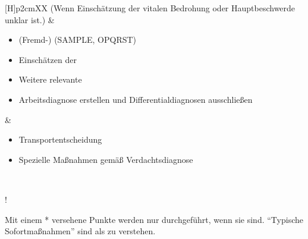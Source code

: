 \documentclass[
ngerman,
paper=a4,
asymmetric,
fontsize=10pt,
headings=small,
draft=false,
numbers=noenddot,
bibtotocnumbered,
footnotes=multiple,
]{scrreprt}
\begin{document}
{\begin{minipage}[t]{\linewidth -
{2\fboxrule} - {2\fboxsep}}
\begin{minipage}[t]{\linewidth}
{\begin{tabularx}{\linewidth}[H]{p{2cm}XX}
{\tiny (Wenn Einschätzung der vitalen
Bedrohung oder Hauptbeschwerde unklar ist.)}
&
\begin{minipage}[t]{\linewidth}
\begin{itemize}
  \item (Fremd-)  (SAMPLE, OPQRST)
  \item Einschätzen der 
  \item Weitere relevante 
  \item Arbeitsdiagnose erstellen und Differentialdiagnosen
  ausschließen
\end{itemize}
\end{minipage}
&
\noindent\color{Indigo}\begin{minipage}[t]{\linewidth}
\begin{itemize}
  \item Transportentscheidung 
  \item Spezielle Maßnahmen gemäß Verdachtsdiagnose
\end{itemize}
\end{minipage}
\\\addlinespace\bottomrule
\end{tabularx}

\begin{center}
  !

{\tiny Mit einem * versehene Punkte werden nur durchgeführt,
wenn sie  sind. \enquote{Typische
Sofortmaßnahmen} sind als  zu verstehen.}
\end{center}
}
\end{minipage}
\end{minipage}%
}
\end{document}
